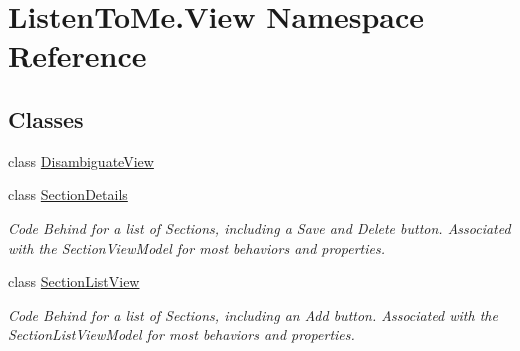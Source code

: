 \hypertarget{namespace_listen_to_me_1_1_view}{}\section{Listen\+To\+Me.\+View Namespace Reference}
\label{namespace_listen_to_me_1_1_view}
\subsection*{Classes}
\begin{DoxyCompactItemize}
\item 
class \hyperlink{class_listen_to_me_1_1_view_1_1_disambiguate_view}{Disambiguate\+View}
\item 
class \hyperlink{class_listen_to_me_1_1_view_1_1_section_details}{Section\+Details}
\begin{DoxyCompactList}\small\item\em Code Behind for a list of Sections, including a Save and Delete button. Associated with the Section\+View\+Model for most behaviors and properties. \end{DoxyCompactList}\item 
class \hyperlink{class_listen_to_me_1_1_view_1_1_section_list_view}{Section\+List\+View}
\begin{DoxyCompactList}\small\item\em Code Behind for a list of Sections, including an Add button. Associated with the Section\+List\+View\+Model for most behaviors and properties. \end{DoxyCompactList}\end{DoxyCompactItemize}
